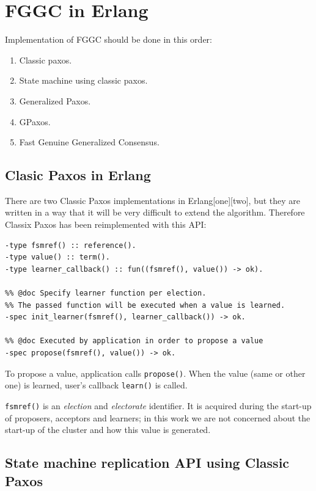\documentclass[english,11pt]{article}
\newcommand{\fggc}{Fast Genuine Generalized Consensus}
\begin{document}
\section{FGGC in Erlang}
\label{sec:paxos-api}

Implementation of FGGC should be done in this order:

\begin{enumerate}
    \item Classic paxos.
    \item State machine using classic paxos.
    \item Generalized Paxos.
    \item GPaxos.
    \item \fggc.
\end{enumerate}

\subsection{Clasic Paxos in Erlang}

There are two Classic Paxos implementations in Erlang[one][two], but they are
written in a way that it will be very difficult to extend the algorithm.
Therefore Classix Paxos has been reimplemented with this API:

\begin{verbatim}
-type fsmref() :: reference().
-type value() :: term().
-type learner_callback() :: fun((fsmref(), value()) -> ok).

%% @doc Specify learner function per election.
%% The passed function will be executed when a value is learned.
-spec init_learner(fsmref(), learner_callback()) -> ok.

%% @doc Executed by application in order to propose a value
-spec propose(fsmref(), value()) -> ok.
\end{verbatim}

To propose a value, application calls {\tt propose()}. When the value (same or
other one) is learned, user's callback {\tt learn()} is called.

{\tt fsmref()} is an \emph{election} and \emph{electorate} identifier. It is
acquired during the start-up of proposers, acceptors and learners; in this work
we are not concerned about the start-up of the cluster and how this value is
generated.

\subsection{State machine replication API using Classic Paxos}
\end{document}
